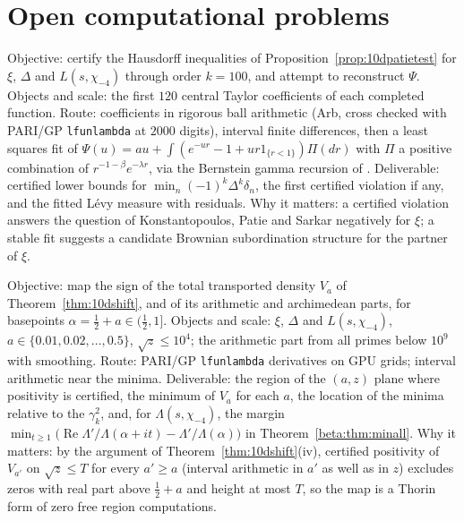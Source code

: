 \section{Open computational problems}

\begin{compproblem}\label{cp:10dpatie}
Objective: certify the Hausdorff inequalities of Proposition~\ref{prop:10dpatietest} for $\xi$, $\Delta$ and $L(s,\chi_{-4})$ through order $k = 100$, and attempt to reconstruct $\Psi$. Objects and scale: the first $120$ central Taylor coefficients of each completed function. Route: coefficients in rigorous ball arithmetic (Arb, cross checked with PARI/GP \texttt{lfunlambda} at $2000$ digits), interval finite differences, then a least squares fit of $\Psi(u) = au+\int(e^{-ur}-1+ur\mathrm{1}_{\{r<1\}})\Pi(dr)$ with $\Pi$ a positive combination of $r^{-1-\beta}e^{-\lambda r}$, via the Bernstein gamma recursion of \cite{patiesavov2018}. Deliverable: certified lower bounds for $\min_n(-1)^k\Delta^k\delta_n$, the first certified violation if any, and the fitted L\'evy measure with residuals. Why it matters: a certified violation answers the question of Konstantopoulos, Patie and Sarkar negatively for $\xi$; a stable fit suggests a candidate Brownian subordination structure for the partner of $\xi$.
\end{compproblem}

\begin{compproblem}
Objective: map the sign of the total transported density $V_a$ of Theorem~\ref{thm:10dshift}, and of its arithmetic and archimedean parts, for basepoints $\alpha = \frac12+a\in(\frac12,1]$. Objects and scale: $\xi$, $\Delta$ and $L(s,\chi_{-4})$, $a\in\{0.01,0.02,\dots,0.5\}$, $\sqrt z\le10^4$; the arithmetic part from all primes below $10^9$ with smoothing. Route: PARI/GP \texttt{lfunlambda} derivatives on GPU grids; interval arithmetic near the minima. Deliverable: the region of the $(a,z)$ plane where positivity is certified, the minimum of $V_a$ for each $a$, the location of the minima relative to the $\gamma_k^2$, and, for $\Lambda(s,\chi_{-4})$, the margin $\min_{t\ge1}\bigl(\operatorname{Re}\Lambda'/\Lambda(\alpha+it)-\Lambda'/\Lambda(\alpha)\bigr)$ in Theorem~\ref{beta:thm:minall}. Why it matters: by the argument of Theorem~\ref{thm:10dshift}(iv), certified positivity of $V_{a'}$ on $\sqrt z\le T$ for every $a'\ge a$ (interval arithmetic in $a'$ as well as in $z$) excludes zeros with real part above $\frac12+a$ and height at most $T$, so the map is a Thorin form of zero free region computations.
\end{compproblem}

